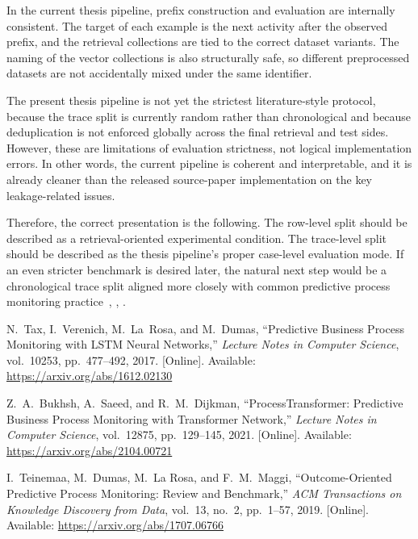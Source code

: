 \documentclass[version=last
        ,DIV=12
        ,BCOR=12mm
        ,twoside=false
        ,twocolumn=false
        ,open=any
        ,headinclude=false
        ,footinclude=false
        ,chapterprefix=true
        ,draft=false
        ,fontsize=11pt
        ,headings=big
        ,headsepline=true
        ,footsepline=false
        ,titlepage=false
        ,parskip=false
        ,captions=tableheading
]{scrbook}
\begin{document}
\indent In the current thesis pipeline, prefix construction and evaluation are
internally consistent. The target of each example is the next activity after
the observed prefix, and the retrieval collections are tied to the correct
dataset variants. The naming of the vector collections is also structurally
safe, so different preprocessed datasets are not accidentally mixed under the
same identifier.

\indent The present thesis pipeline is not yet the strictest literature-style
protocol, because the trace split is currently random rather than
chronological and because deduplication is not enforced globally across the
final retrieval and test sides. However, these are limitations of evaluation
strictness, not logical implementation errors. In other words, the current
pipeline is coherent and interpretable, and it is already cleaner than the
released source-paper implementation on the key leakage-related issues.

\indent Therefore, the correct presentation is the following. The row-level
split should be described as a retrieval-oriented experimental condition. The
trace-level split should be described as the thesis pipeline's proper
case-level evaluation mode. If an even stricter benchmark is desired later,
the natural next step would be a chronological trace split aligned more
closely with common predictive process monitoring practice~,
, .

\begin{thebibliography}{9}

\label{bib:tax2017}
N.~Tax, I.~Verenich, M.~La~Rosa, and M.~Dumas,
``Predictive Business Process Monitoring with LSTM Neural Networks,''
\textit{Lecture Notes in Computer Science},
vol.~10253, pp.~477--492, 2017.
[Online]. Available: \url{https://arxiv.org/abs/1612.02130}

\label{bib:processtransformer2021}
Z.~A.~Bukhsh, A.~Saeed, and R.~M.~Dijkman,
``ProcessTransformer: Predictive Business Process Monitoring with Transformer Network,''
\textit{Lecture Notes in Computer Science},
vol.~12875, pp.~129--145, 2021.
[Online]. Available: \url{https://arxiv.org/abs/2104.00721}

\label{bib:teinemaa2018}
I.~Teinemaa, M.~Dumas, M.~La Rosa, and F.~M.~Maggi,
``Outcome-Oriented Predictive Process Monitoring: Review and Benchmark,''
\textit{ACM Transactions on Knowledge Discovery from Data},
vol.~13, no.~2, pp.~1--57, 2019.
[Online]. Available: \url{https://arxiv.org/abs/1707.06766}

\end{thebibliography}
\end{document}
